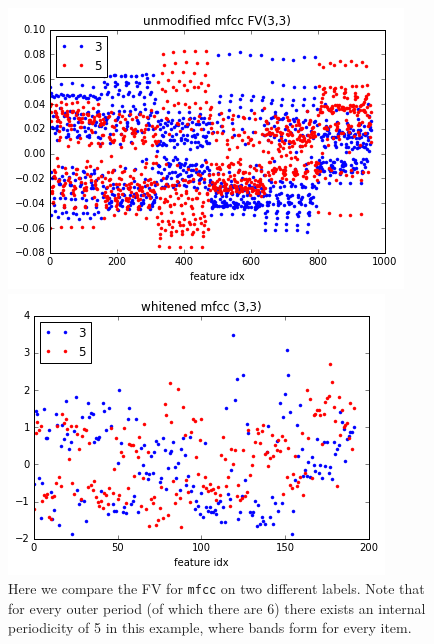 \documentclass{article}
\begin{document}
\begin{figure}[H]
    \centering
    
    \begin{minipage}[b]{0.3\textwidth}
        \includegraphics[width=\textwidth]{unmodified-mfcc3-3.png}
    \end{minipage}
    \hfill
    \begin{minipage}[b]{0.3\textwidth}
        \includegraphics[width=\textwidth]{whitened-riffled-mfcc3-3.png}
    \end{minipage}
    
    \label{fig:fv33}
    \caption{Here we compare the FV for \texttt{mfcc} on two different labels. Note that for every outer period (of which there are 6) there exists an internal periodicity of 5 in this example, where bands form for every item.}
\end{figure}
\end{document}
